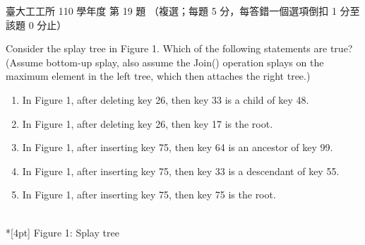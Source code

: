 \begin{pastexam}[label={px:ntu-110-ie-ds-19}]{臺大工工所 110 學年度 第 19 題}
（複選；每題 5 分，每答錯一個選項倒扣 1 分至該題 0 分止）

Consider the splay tree in Figure 1. Which of the following statements are true?\\
(Assume bottom-up splay, also assume the Join() operation splays on the maximum element in the left
tree, which then attaches the right tree.)
\begin{enumerate}[label=(\Alph*)]
\item In Figure 1, after deleting key 26, then key 33 is a child of key 48.
\item In Figure 1, after deleting key 26, then key 17 is the root.
\item In Figure 1, after inserting key 75, then key 64 is an ancestor of key 99.
\item In Figure 1, after inserting key 75, then key 33 is a descendant of key 55.
\item In Figure 1, after inserting key 75, then key 75 is the root.
\end{enumerate}
\begin{center}
\\*[4pt] Figure 1: Splay tree
\end{center}
\end{pastexam}

